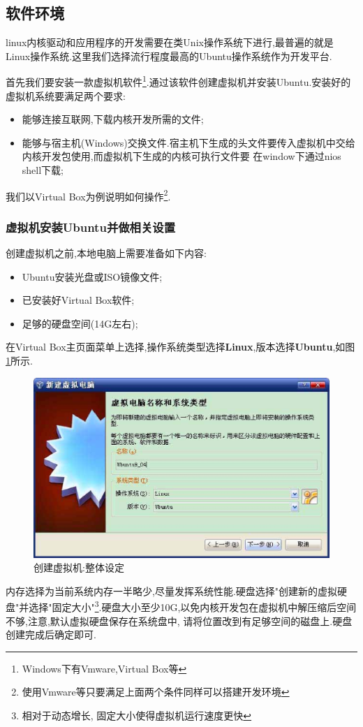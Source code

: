 \documentclass[12pt,a4paper,titlepage]{article}
\begin{document}
\subsection{软件环境}
linux内核驱动和应用程序的开发需要在类Unix操作系统下进行,最普遍的就是Linux操作系统.这里我们选择流行程度最高的Ubuntu操作系统作为开发平台.

首先我们要安装一款虚拟机软件\footnote{Windows下有Vmware,Virtual Box等}.通过该软件创建虚拟机并安装Ubuntu.安装好的虚拟机系统要满足两个要求:
\begin{itemize}
\item 能够连接互联网,下载内核开发所需的文件;
\item 能够与宿主机(Windows)交换文件.宿主机下生成的头文件要传入虚拟机中交给内核开发包使用,而虚拟机下生成的内核可执行文件要
在window下通过nios shell下载;
\end{itemize}

我们以Virtual Box为例说明如何操作\footnote{使用Vmware等只要满足上面两个条件同样可以搭建开发环境}.
\subsubsection{虚拟机安装Ubuntu并做相关设置}
创建虚拟机之前,本地电脑上需要准备如下内容:
\begin{itemize}
\item Ubuntu安装光盘或ISO镜像文件;
\item 已安装好Virtual Box软件;
\item 足够的硬盘空间(14G左右);
\end{itemize}

在Virtual Box主页面菜单上选择,操作系统类型选择\textbf{Linux},版本选择\textbf{Ubuntu},如图\ref{f_create_vb1}所示.
\begin{figure}[!bthp]
\centering\includegraphics[width=1\textwidth]{pic/f_create_vb1.eps}
\caption{创建虚拟机:整体设定\label{f_create_vb1}}
\end{figure}
内存选择为当前系统内存一半略少,尽量发挥系统性能.硬盘选择"创建新的虚拟硬盘"并选择"固定大小"\footnote{相对于动态增长,
固定大小使得虚拟机运行速度更快}.硬盘大小至少10G,以免内核开发包在虚拟机中解压缩后空间不够,{注意,默认虚拟硬盘保存在系统盘中,
请将位置改到有足够空间的磁盘上}.硬盘创建完成后确定即可.
\end{document}
